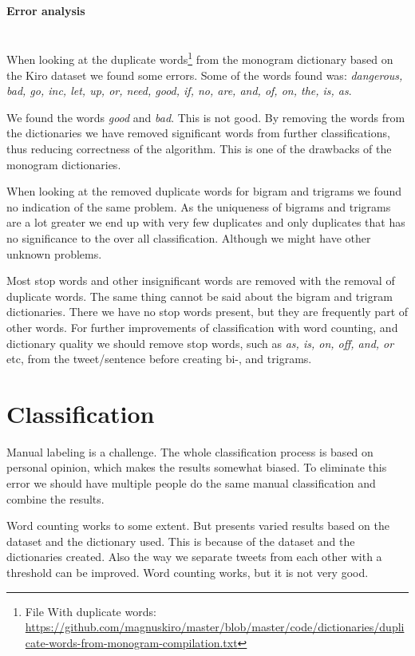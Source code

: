 \paragraph{Error analysis}
\hspace{0pt}\\
When looking at the duplicate words\footnote{File With duplicate words:
\url{https://github.com/magnuskiro/master/blob/master/code/dictionaries/duplicate-words-from-monogram-compilation.txt}}
from the monogram dictionary based on the Kiro dataset we found some errors.
Some of the words found was: \textit{dangerous, bad, go, inc, let, up, or, need,
good, if, no, are, and, of, on, the, is, as}.

We found the words \textit{good} and \textit{bad}.
This is not good. By removing the words from the dictionaries we have removed
significant words from further classifications, thus reducing correctness of the
algorithm. This is one of the drawbacks of the monogram dictionaries.

When looking at the removed duplicate words for bigram and trigrams we found no
indication of the same problem. As the uniqueness of bigrams and trigrams are a
lot greater we end up with very few duplicates and only duplicates that has no
significance to the over all classification. Although we might have other
unknown problems.

Most stop words and other insignificant words are removed with the removal of
duplicate words. The same thing cannot be said about the bigram and trigram
dictionaries. There we have no stop words present, but they are
frequently part of other words. For further improvements of classification with
word counting, and dictionary quality we should remove
stop words, such as \textit{as, is, on, off, and, or} etc, from the
tweet/sentence before creating bi-, and trigrams.
%

\section{Classification}\label{results:classification}
Manual labeling is a challenge. The whole
classification process is based on personal opinion, which makes the results
somewhat biased. To eliminate this error we should have multiple people do the
same manual classification and combine the results.  

Word counting works to some extent. But presents varied results based on the
dataset and the dictionary used. This is because of the dataset and the
dictionaries created. Also the way we separate tweets from each other with a
threshold can be improved. Word counting works, but it is not very
good. 

